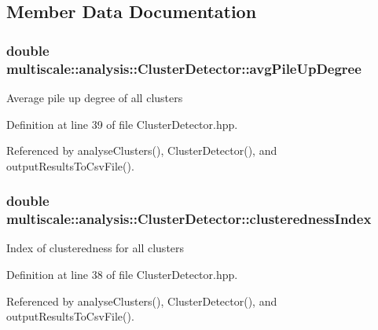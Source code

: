 \subsection{Member Data Documentation}
\hypertarget{classmultiscale_1_1analysis_1_1ClusterDetector_a6f6cfa50cf21ac400d41d6c6f2112bc9}{
\subsubsection[{avg\-Pile\-Up\-Degree}]{\setlength{\rightskip}{0pt plus 5cm}double multiscale\-::analysis\-::\-Cluster\-Detector\-::avg\-Pile\-Up\-Degree\hspace{0.3cm}{\ttfamily [protected]}}}\label{classmultiscale_1_1analysis_1_1ClusterDetector_a6f6cfa50cf21ac400d41d6c6f2112bc9}
Average pile up degree of all clusters 

Definition at line 39 of file Cluster\-Detector.\-hpp.



Referenced by analyse\-Clusters(), Cluster\-Detector(), and output\-Results\-To\-Csv\-File().

\hypertarget{classmultiscale_1_1analysis_1_1ClusterDetector_a5e2bf77041bd0d5047dd16c4632c16b7}{
\subsubsection[{clusteredness\-Index}]{\setlength{\rightskip}{0pt plus 5cm}double multiscale\-::analysis\-::\-Cluster\-Detector\-::clusteredness\-Index\hspace{0.3cm}{\ttfamily [protected]}}}\label{classmultiscale_1_1analysis_1_1ClusterDetector_a5e2bf77041bd0d5047dd16c4632c16b7}
Index of clusteredness for all clusters 

Definition at line 38 of file Cluster\-Detector.\-hpp.



Referenced by analyse\-Clusters(), Cluster\-Detector(), and output\-Results\-To\-Csv\-File().


